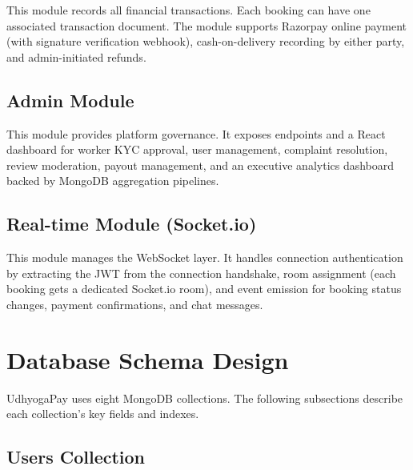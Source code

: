\documentclass[12pt,a4paper]{report}
\begin{document}
This module records all financial transactions. Each booking can have one associated transaction document. The module supports Razorpay online payment (with signature verification webhook), cash-on-delivery recording by either party, and admin-initiated refunds.

\subsection{Admin Module}

This module provides platform governance. It exposes endpoints and a React dashboard for worker KYC approval, user management, complaint resolution, review moderation, payout management, and an executive analytics dashboard backed by MongoDB aggregation pipelines.

\subsection{Real-time Module (Socket.io)}

This module manages the WebSocket layer. It handles connection authentication by extracting the JWT from the connection handshake, room assignment (each booking gets a dedicated Socket.io room), and event emission for booking status changes, payment confirmations, and chat messages.

\section{Database Schema Design}

UdhyogaPay uses eight MongoDB collections. The following subsections describe each collection's key fields and indexes.

\subsection{Users Collection}
\end{document}
